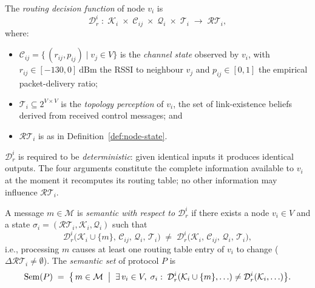 \begin{definition}
\label{def:routing-decision}
The \emph{routing decision function} of node $v_i$ is
\[
  \mathcal{D}_r^i \;:\;
  \mathcal{K}_i \;\times\; \mathcal{C}_{ij} \;\times\; \mathcal{Q}_i \;\times\; \mathcal{T}_i
  \;\longrightarrow\; \mathcal{RT}_i,
\]
where:
\begin{itemize}
  \item $\mathcal{C}_{ij} = \bigl\{\,(r_{ij}, p_{ij}) \mid v_j \in V\bigr\}$ is the
        \emph{channel state} observed by $v_i$, with
        $r_{ij} \in [-130, 0]\ \text{dBm}$ the RSSI to neighbour $v_j$
        and $p_{ij} \in [0,1]$ the empirical packet-delivery ratio;

  \item $\mathcal{T}_i \subseteq 2^{V \times V}$ is the \emph{topology perception}
        of $v_i$, the set of link-existence beliefs derived from received
        control messages; and

  \item $\mathcal{RT}_i$ is as in Definition~\ref{def:node-state}.
\end{itemize}
$\mathcal{D}_r^i$ is required to be \emph{deterministic}: given identical
inputs it produces identical outputs.  The four arguments constitute the
complete information available to $v_i$ at the moment it recomputes its
routing table; no other information may influence $\mathcal{RT}_i$.
\end{definition}

\begin{definition}
\label{def:semantic-information}
A message $m \in \mathcal{M}$ is \emph{semantic with respect to
$\mathcal{D}_r^i$} if there exists a node $v_i \in V$ and a state
$\sigma_i = (\mathcal{RT}_i, \mathcal{K}_i, \mathcal{Q}_i)$ such that
\[
  \mathcal{D}_r^i\!\bigl(\mathcal{K}_i \cup \{m\},\,
                         \mathcal{C}_{ij},\, \mathcal{Q}_i,\, \mathcal{T}_i\bigr)
  \;\neq\;
  \mathcal{D}_r^i\!\bigl(\mathcal{K}_i,\,
                         \mathcal{C}_{ij},\, \mathcal{Q}_i,\, \mathcal{T}_i\bigr),
\]
i.e., processing $m$ causes at least one routing table entry of $v_i$ to
change ($\Delta\mathcal{RT}_i \neq \emptyset$).
The \emph{semantic set} of protocol $P$ is
\[
  \mathrm{Sem}(P) \;=\;
  \bigl\{\, m \in \mathcal{M} \;\bigm|\;
    \exists\, v_i \in V,\; \sigma_i :\;
    \mathcal{D}_r^i(\mathcal{K}_i \cup \{m\}, \ldots)
    \neq
    \mathcal{D}_r^i(\mathcal{K}_i, \ldots)
  \bigr\}.
\]
\end{definition}

